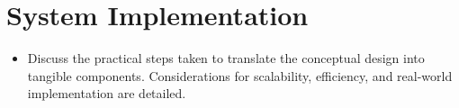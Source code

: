 \section{System Implementation}
\begin{itemize}
\item Discuss the practical steps taken to translate the conceptual design into tangible
components. Considerations for scalability, efficiency, and real-world
implementation are detailed.
\end{itemize}
